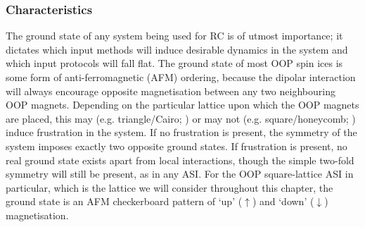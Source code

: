 
\subsubsection{Characteristics} %
The ground state of any system being used for RC is of utmost importance; it dictates which input methods will induce desirable dynamics in the system and which input protocols will fall flat.
The ground state of most OOP spin ices is some form of anti-ferromagnetic (AFM) ordering, because the dipolar interaction will always encourage opposite magnetisation between any two neighbouring OOP magnets.
Depending on the particular lattice upon which the OOP magnets are placed, this may (e.g. triangle/Cairo; ) or may not (e.g. square/honeycomb; ) induce frustration in the system.
If no frustration is present, the symmetry of the system imposes exactly two opposite ground states.
If frustration is present, no real ground state exists apart from local interactions, though the simple two-fold symmetry will still be present, as in any ASI.
For the OOP square-lattice ASI in particular, which is the lattice we will consider throughout this chapter, the ground state is an AFM checkerboard pattern of `up' ($\uparrow$) and `down' ($\downarrow$) magnetisation.

